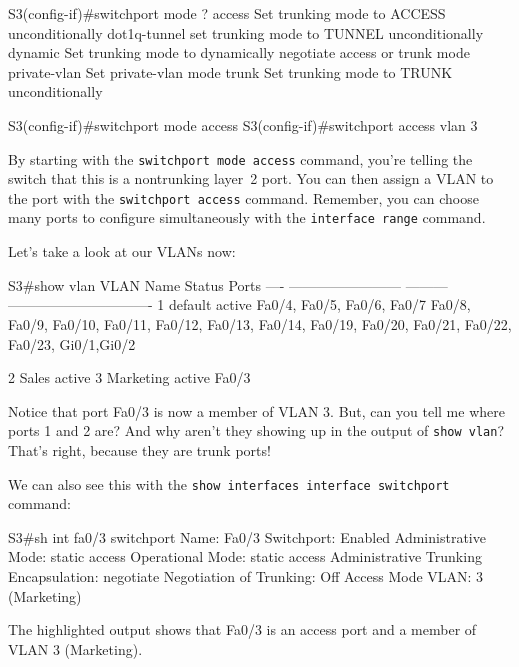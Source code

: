 \begin{cli}
S3(config-if)#switchport mode ?
    access        Set trunking mode to ACCESS unconditionally
  dot1q-tunnel  set trunking mode to TUNNEL unconditionally
  dynamic       Set trunking mode to dynamically negotiate access or trunk mode
  private-vlan  Set private-vlan mode
  trunk         Set trunking mode to TRUNK unconditionally
 
S3(config-if)#switchport mode access
S3(config-if)#switchport access vlan 3
\end{cli}

By starting with the \texttt{switchport\ mode\ access} command, you're
telling the switch that this is a nontrunking layer~2 port. You can then
assign a VLAN to the port with the \texttt{switchport\ access} command.
Remember, you can choose many ports to configure simultaneously with the
\texttt{interface\ range} command.

Let's take a look at our VLANs now:

\begin{cli}
S3#show vlan
VLAN Name                       Status    Ports
---- ------------------------ --------- -------------------------------
1    default                   active     Fa0/4, Fa0/5, Fa0/6, Fa0/7
                                          Fa0/8, Fa0/9, Fa0/10, Fa0/11,
                                          Fa0/12, Fa0/13, Fa0/14, Fa0/19,
                                          Fa0/20, Fa0/21, Fa0/22, Fa0/23,
                                          Gi0/1,Gi0/2
 
2    Sales                     active
3    Marketing                 active    Fa0/3
\end{cli}

Notice that port Fa0/3 is now a member of VLAN 3. But, can you tell me where ports 1 and
2 are? And why aren't they showing up in the output of
\texttt{show\ vlan}? That's right, because they are trunk ports!

We can also see this with the
\texttt{show\ interfaces\ interface\ switchport} command:

\begin{cli}
S3#sh int fa0/3 switchport
Name: Fa0/3
Switchport: Enabled
Administrative Mode: static access
Operational Mode: static access
Administrative Trunking Encapsulation: negotiate
Negotiation of Trunking: Off
Access Mode VLAN: 3 (Marketing)
\end{cli}

The highlighted output shows that Fa0/3 is an access port and a member
of VLAN 3 (Marketing).

